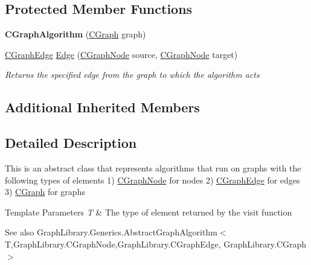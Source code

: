 \subsection*{Protected Member Functions}
\begin{DoxyCompactItemize}
\item 
\hypertarget{class_graph_library_1_1_c_graph_algorithm_ae4e0cf018a52938dca6f2e2fe1e4e6e1}{}{\bfseries C\+Graph\+Algorithm} (\hyperlink{class_graph_library_1_1_c_graph}{C\+Graph} graph)\label{class_graph_library_1_1_c_graph_algorithm_ae4e0cf018a52938dca6f2e2fe1e4e6e1}

\item 
\hyperlink{class_graph_library_1_1_c_graph_edge}{C\+Graph\+Edge} \hyperlink{class_graph_library_1_1_c_graph_algorithm_a0fc2d16057b2bbca80245546f0d2b5ad}{Edge} (\hyperlink{class_graph_library_1_1_c_graph_node}{C\+Graph\+Node} source, \hyperlink{class_graph_library_1_1_c_graph_node}{C\+Graph\+Node} target)
\begin{DoxyCompactList}\small\item\em Returns the specified edge from the graph to which the algorithm acts \end{DoxyCompactList}\end{DoxyCompactItemize}
\subsection*{Additional Inherited Members}


\subsection{Detailed Description}
This is an abstract class that represents algorithms that run on graphs with the following types of elements 1) \hyperlink{class_graph_library_1_1_c_graph_node}{C\+Graph\+Node} for nodes 2) \hyperlink{class_graph_library_1_1_c_graph_edge}{C\+Graph\+Edge} for edges 3) \hyperlink{class_graph_library_1_1_c_graph}{C\+Graph} for graphs 


\begin{DoxyTemplParams}{Template Parameters}
{\em T} & The type of element returned by the visit function\\
\hline
\end{DoxyTemplParams}
\begin{DoxySeeAlso}{See also}
Graph\+Library.\+Generics.\+Abstract\+Graph\+Algorithm$<$\+T,\+Graph\+Library.\+C\+Graph\+Node,\+Graph\+Library.\+C\+Graph\+Edge, Graph\+Library.\+C\+Graph$>$


\end{DoxySeeAlso}


